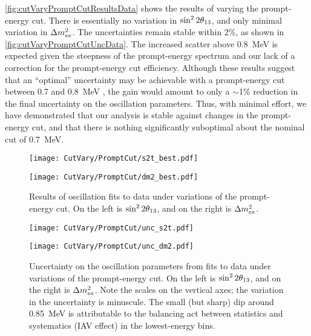\documentclass[../thesis.tex]{subfiles}
\begin{document}

\autoref{fig:cutVaryPromptCutResultsData} shows the results of varying the prompt-energy cut. There is essentially no variation in $\sin^2 2\theta_{13}$, and only minimal variation in $\Delta m^2_{ee}$. The uncertainties remain stable within 2\%, as shown in \autoref{fig:cutVaryPromptCutUncData}. The increased scatter above 0.8~MeV is expected given the steepness of the prompt-energy spectrum and our lack of a correction for the prompt-energy cut efficiency. Although these results suggest that an ``optimal'' uncertainty may be achievable with a prompt-energy cut between 0.7 and 0.8~MeV%
, the gain would amount to only a $\sim$1\% reduction in the final uncertainty on the oscillation parameters. Thus, with minimal effort, we have demonstrated that our analysis is stable against changes in the prompt-energy cut, and that there is nothing significantly suboptimal about the nominal cut of 0.7~MeV.

\begin{figure}[ht]
  \begin{minipage}{0.47\linewidth}%
    \texttt{[image: CutVary/PromptCut/s2t\_best.pdf]}%
  \end{minipage}%
  \begin{minipage}{0.47\linewidth}%
    \texttt{[image: CutVary/PromptCut/dm2\_best.pdf]}%
  \end{minipage}%
  \caption{Results of oscillation fits to data under variations of the prompt-energy cut. On the left is $\sin^2 2\theta_{13}$, and on the right is $\Delta m^2_{ee}$.}
  \label{fig:cutVaryPromptCutResultsData}
\end{figure}

\begin{figure}[ht]
  \begin{minipage}{0.47\linewidth}%
    \texttt{[image: CutVary/PromptCut/unc\_s2t.pdf]}%
  \end{minipage}%
  \begin{minipage}{0.47\linewidth}%
    \texttt{[image: CutVary/PromptCut/unc\_dm2.pdf]}%
  \end{minipage}%
  \caption{Uncertainty on the oscillation parameters from fits to data under variations of the prompt-energy cut. On the left is $\sin^2 2\theta_{13}$, and on the right is $\Delta m^2_{ee}$. Note the scales on the vertical axes; the variation in the uncertainty is minuscule. The small (but sharp) dip around 0.85~MeV is attributable to the balancing act between statistics and systematics (IAV effect) in the lowest-energy bins.}
  \label{fig:cutVaryPromptCutUncData}
\end{figure}
\end{document}
